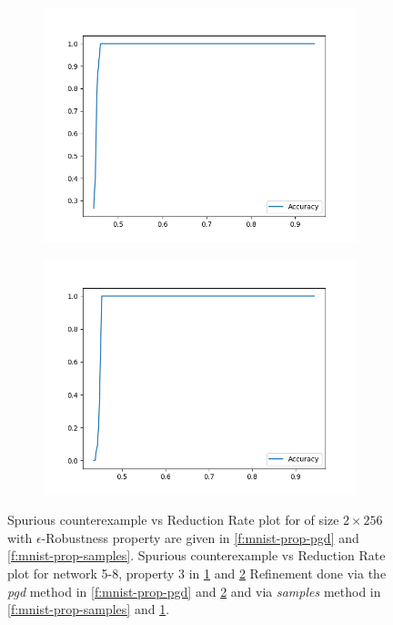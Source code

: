 \begin{figure}
    \begin{subfigure}{0.475\linewidth}
        \includegraphics[scale=0.275]{figs/acas_ncex_5_8_3_samples.png}
        \caption{}
        \label{f:acas-ncex-samples}
    \end{subfigure}
    \begin{subfigure}{0.475\linewidth}
        \includegraphics[scale=0.275]{figs/acas_ncex_5_8_3_pgd.png}
        \caption{}
        \label{f:acas-ncex-pgd}
    \end{subfigure}

    \caption{
        Spurious counterexample vs Reduction Rate plot for \mnist of size $2
        \times 256$ with $\epsilon$-Robustness property are given in 
        \ref{f:mnist-prop-pgd} and \ref{f:mnist-prop-samples}. 
        Spurious counterexample vs Reduction Rate plot for \acasxu network 5-8,
        property 3 in \ref{f:acas-ncex-samples} and \ref{f:acas-ncex-pgd}
        Refinement done via the \textit{pgd} method in
        \ref{f:mnist-prop-pgd} and \ref{f:acas-ncex-pgd} and 
        via \textit{samples} method in \ref{f:mnist-prop-samples} and
        \ref{f:acas-ncex-samples}.
    }
    \label{f:ncex}
\end{figure}

